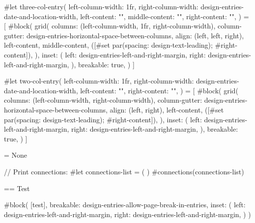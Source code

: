 #let three-col-entry(
  left-column-width: 1fr,
  right-column-width: design-entries-date-and-location-width,
  left-content: "",
  middle-content: "",
  right-content: "",
) = [
  #block(
    grid(
      columns: (left-column-width, 1fr, right-column-width),
      column-gutter: design-entries-horizontal-space-between-columns,
      align: (left, left, right),
      left-content, middle-content, ([#set par(spacing: design-text-leading); #right-content]),
    ),
    inset: (
      left: design-entries-left-and-right-margin,
      right: design-entries-left-and-right-margin,
    ),
    breakable: true,
  )
]

#let two-col-entry(
  left-column-width: 1fr,
  right-column-width: design-entries-date-and-location-width,
  left-content: "",
  right-content: "",
) = [
  #block(
    grid(
      columns: (left-column-width, right-column-width),
      column-gutter: design-entries-horizontal-space-between-columns,
      align: (left, right),
      left-content, ([#set par(spacing: design-text-leading); #right-content]),
    ),
    inset: (
      left: design-entries-left-and-right-margin,
      right: design-entries-left-and-right-margin,
    ),
    breakable: true,
  )
]

= None

// Print connections:
#let connections-list = (
)
#connections(connections-list)

== Test

#block(
  [test],
  breakable: design-entries-allow-page-break-in-entries,
  inset: (
    left: design-entries-left-and-right-margin,
    right: design-entries-left-and-right-margin,
  )
)


